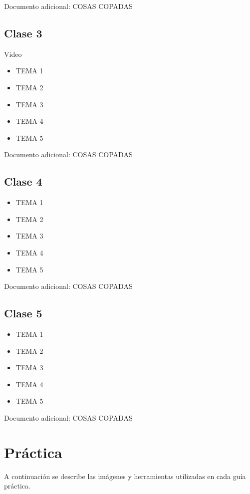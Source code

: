 \documentclass[12pt]{report}
\begin{document}
Documento adicional: COSAS COPADAS

\section{Clase 3}

Video

\begin{itemize}
    \item TEMA 1
    \item TEMA 2
    \item TEMA 3
    \item TEMA 4
    \item TEMA 5
\end{itemize}

Documento adicional: COSAS COPADAS

\section{Clase 4}

\begin{itemize}
    \item TEMA 1
    \item TEMA 2
    \item TEMA 3
    \item TEMA 4
    \item TEMA 5
\end{itemize}

Documento adicional: COSAS COPADAS

\section{Clase 5}

\begin{itemize}
    \item TEMA 1
    \item TEMA 2
    \item TEMA 3
    \item TEMA 4
    \item TEMA 5
\end{itemize}

Documento adicional: COSAS COPADAS

\chapter{Práctica}\label{practica}

A continuación se describe las imágenes y herramientas utilizadas en cada guía práctica.
\end{document}
